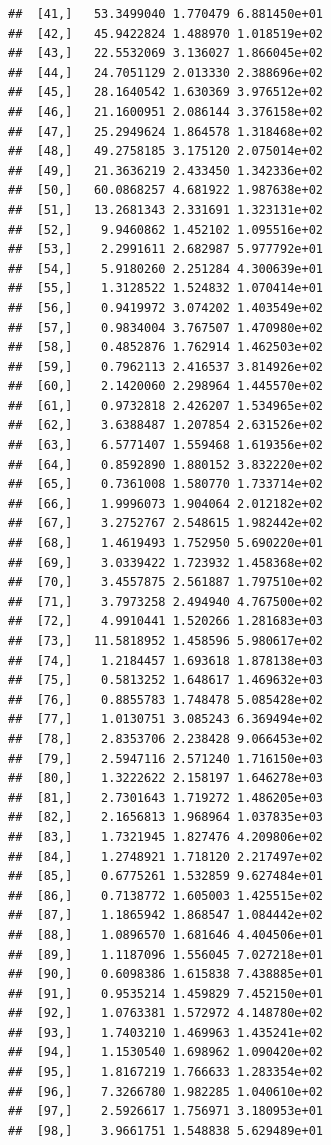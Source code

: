 \documentclass[article]{jss}\usepackage[]{graphicx}\usepackage[]{xcolor}
\makeatletter
\newenvironment{kframe}{%
 \def\at@end@of@kframe{}%
 \ifinner\ifhmode%
  \def\at@end@of@kframe{\end{minipage}}%
  \begin{minipage}{\columnwidth}%
 \fi\fi%
 \def\FrameCommand##1{\hskip\@totalleftmargin \hskip-\fboxsep
 \colorbox{shadecolor}{##1}\hskip-\fboxsep
     \hskip-\linewidth \hskip-\@totalleftmargin \hskip\columnwidth}%
 \MakeFramed {\advance\hsize-\width
   \@totalleftmargin\z@ \linewidth\hsize
   \@setminipage}}%
 {\par\unskip\endMakeFramed%
 \at@end@of@kframe}
\newenvironment{knitrout}{}{} %
\makeatother
\begin{document}
\begin{knitrout}
\begin{kframe}
\begin{verbatim}
##  [41,]   53.3499040 1.770479 6.881450e+01
##  [42,]   45.9422824 1.488970 1.018519e+02
##  [43,]   22.5532069 3.136027 1.866045e+02
##  [44,]   24.7051129 2.013330 2.388696e+02
##  [45,]   28.1640542 1.630369 3.976512e+02
##  [46,]   21.1600951 2.086144 3.376158e+02
##  [47,]   25.2949624 1.864578 1.318468e+02
##  [48,]   49.2758185 3.175120 2.075014e+02
##  [49,]   21.3636219 2.433450 1.342336e+02
##  [50,]   60.0868257 4.681922 1.987638e+02
##  [51,]   13.2681343 2.331691 1.323131e+02
##  [52,]    9.9460862 1.452102 1.095516e+02
##  [53,]    2.2991611 2.682987 5.977792e+01
##  [54,]    5.9180260 2.251284 4.300639e+01
##  [55,]    1.3128522 1.524832 1.070414e+01
##  [56,]    0.9419972 3.074202 1.403549e+02
##  [57,]    0.9834004 3.767507 1.470980e+02
##  [58,]    0.4852876 1.762914 1.462503e+02
##  [59,]    0.7962113 2.416537 3.814926e+02
##  [60,]    2.1420060 2.298964 1.445570e+02
##  [61,]    0.9732818 2.426207 1.534965e+02
##  [62,]    3.6388487 1.207854 2.631526e+02
##  [63,]    6.5771407 1.559468 1.619356e+02
##  [64,]    0.8592890 1.880152 3.832220e+02
##  [65,]    0.7361008 1.580770 1.733714e+02
##  [66,]    1.9996073 1.904064 2.012182e+02
##  [67,]    3.2752767 2.548615 1.982442e+02
##  [68,]    1.4619493 1.752950 5.690220e+01
##  [69,]    3.0339422 1.723932 1.458368e+02
##  [70,]    3.4557875 2.561887 1.797510e+02
##  [71,]    3.7973258 2.494940 4.767500e+02
##  [72,]    4.9910441 1.520266 1.281683e+03
##  [73,]   11.5818952 1.458596 5.980617e+02
##  [74,]    1.2184457 1.693618 1.878138e+03
##  [75,]    0.5813252 1.648617 1.469632e+03
##  [76,]    0.8855783 1.748478 5.085428e+02
##  [77,]    1.0130751 3.085243 6.369494e+02
##  [78,]    2.8353706 2.238428 9.066453e+02
##  [79,]    2.5947116 2.571240 1.716150e+03
##  [80,]    1.3222622 2.158197 1.646278e+03
##  [81,]    2.7301643 1.719272 1.486205e+03
##  [82,]    2.1656813 1.968964 1.037835e+03
##  [83,]    1.7321945 1.827476 4.209806e+02
##  [84,]    1.2748921 1.718120 2.217497e+02
##  [85,]    0.6775261 1.532859 9.627484e+01
##  [86,]    0.7138772 1.605003 1.425515e+02
##  [87,]    1.1865942 1.868547 1.084442e+02
##  [88,]    1.0896570 1.681646 4.404506e+01
##  [89,]    1.1187096 1.556045 7.027218e+01
##  [90,]    0.6098386 1.615838 7.438885e+01
##  [91,]    0.9535214 1.459829 7.452150e+01
##  [92,]    1.0763381 1.572972 4.148780e+02
##  [93,]    1.7403210 1.469963 1.435241e+02
##  [94,]    1.1530540 1.698962 1.090420e+02
##  [95,]    1.8167219 1.766633 1.283354e+02
##  [96,]    7.3266780 1.982285 1.040610e+02
##  [97,]    2.5926617 1.756971 3.180953e+01
##  [98,]    3.9661751 1.548838 5.629489e+01

\end{verbatim}
\end{kframe}
\end{knitrout}
\end{document}
